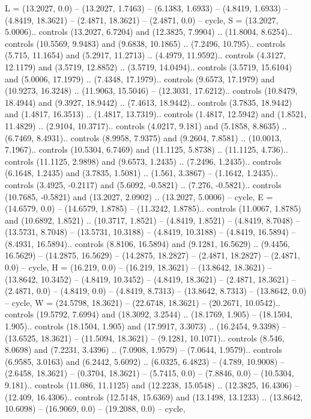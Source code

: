 {L} = {(13.2027, 0.0) -- (13.2027, 1.7463) -- (6.1383, 1.6933) -- (4.8419, 1.6933) -- (4.8419, 18.3621) -- (2.4871, 18.3621) -- (2.4871, 0.0) -- cycle},
{S} = {(13.2027, 5.0006).. controls (13.2027, 6.7204) and (12.3825, 7.9904) .. (11.8004, 8.6254).. controls (10.5569, 9.9483) and (9.6838, 10.1865) .. (7.2496, 10.795).. controls (5.715, 11.1654) and (5.2917, 11.2713) .. (4.4979, 11.9592).. controls (4.3127, 12.1179) and (3.5719, 12.8852) .. (3.5719, 14.0494).. controls (3.5719, 15.6104) and (5.0006, 17.1979) .. (7.4348, 17.1979).. controls (9.6573, 17.1979) and (10.9273, 16.3248) .. (11.9063, 15.5046) -- (12.3031, 17.6212).. controls (10.8479, 18.4944) and (9.3927, 18.9442) .. (7.4613, 18.9442).. controls (3.7835, 18.9442) and (1.4817, 16.3513) .. (1.4817, 13.7319).. controls (1.4817, 12.5942) and (1.8521, 11.4829) .. (2.9104, 10.3717).. controls (4.0217, 9.181) and (5.1858, 8.8635) .. (6.7469, 8.4931).. controls (8.9958, 7.9375) and (9.2604, 7.8581) .. (10.0013, 7.1967).. controls (10.5304, 6.7469) and (11.1125, 5.8738) .. (11.1125, 4.736).. controls (11.1125, 2.9898) and (9.6573, 1.2435) .. (7.2496, 1.2435).. controls (6.1648, 1.2435) and (3.7835, 1.5081) .. (1.561, 3.3867) -- (1.1642, 1.2435).. controls (3.4925, -0.2117) and (5.6092, -0.5821) .. (7.276, -0.5821).. controls (10.7685, -0.5821) and (13.2027, 2.0902) .. (13.2027, 5.0006) -- cycle},
{E} = {(14.6579, 0.0) -- (14.6579, 1.8785) -- (11.3242, 1.8785).. controls (11.0067, 1.8785) and (10.6892, 1.8521) .. (10.3717, 1.8521) -- (4.8419, 1.8521) -- (4.8419, 8.7048) -- (13.5731, 8.7048) -- (13.5731, 10.3188) -- (4.8419, 10.3188) -- (4.8419, 16.5894) -- (8.4931, 16.5894).. controls (8.8106, 16.5894) and (9.1281, 16.5629) .. (9.4456, 16.5629) -- (14.2875, 16.5629) -- (14.2875, 18.2827) -- (2.4871, 18.2827) -- (2.4871, 0.0) -- cycle},
{H} = {(16.219, 0.0) -- (16.219, 18.3621) -- (13.8642, 18.3621) -- (13.8642, 10.3452) -- (4.8419, 10.3452) -- (4.8419, 18.3621) -- (2.4871, 18.3621) -- (2.4871, 0.0) -- (4.8419, 0.0) -- (4.8419, 8.7313) -- (13.8642, 8.7313) -- (13.8642, 0.0) -- cycle},
{W} = {(24.5798, 18.3621) -- (22.6748, 18.3621) -- (20.2671, 10.0542).. controls (19.5792, 7.6994) and (18.3092, 3.2544) .. (18.1769, 1.905) -- (18.1504, 1.905).. controls (18.1504, 1.905) and (17.9917, 3.3073) .. (16.2454, 9.3398) -- (13.6525, 18.3621) -- (11.5094, 18.3621) -- (9.1281, 10.1071).. controls (8.546, 8.0698) and (7.2231, 3.4396) .. (7.0908, 1.9579) -- (7.0644, 1.9579).. controls (6.9585, 3.0163) and (6.2442, 5.6092) .. (6.0325, 6.4823) -- (4.789, 10.9008) -- (2.6458, 18.3621) -- (0.3704, 18.3621) -- (5.7415, 0.0) -- (7.8846, 0.0) -- (10.5304, 9.181).. controls (11.086, 11.1125) and (12.2238, 15.0548) .. (12.3825, 16.4306) -- (12.409, 16.4306).. controls (12.5148, 15.6369) and (13.1498, 13.1233) .. (13.8642, 10.6098) -- (16.9069, 0.0) -- (19.2088, 0.0) -- cycle},

